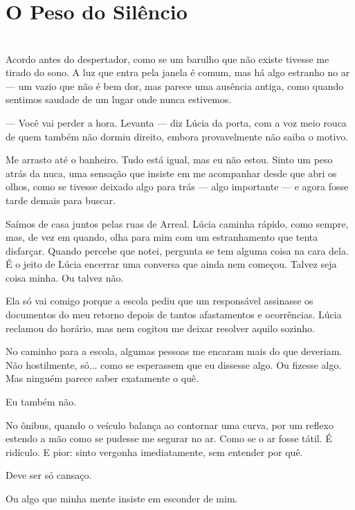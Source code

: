 \newpage
\ifdefined\useChapters
\chapter{O Peso do Silêncio}
\else
\chapter{}
\fi

Acordo antes do despertador, como se um barulho que não existe tivesse me tirado do sono. A luz que entra pela janela é comum, mas há algo estranho no ar — um vazio que não é bem dor, mas parece uma ausência antiga, como quando sentimos saudade de um lugar onde nunca estivemos.

— Você vai perder a hora. Levanta — diz Lúcia da porta, com a voz meio rouca de quem também não dormiu direito, embora provavelmente não saiba o motivo.

Me arrasto até o banheiro. Tudo está igual, mas eu não estou. Sinto um peso atrás da nuca, uma sensação que insiste em me acompanhar desde que abri os olhos, como se tivesse deixado algo para trás — algo importante — e agora fosse tarde demais para buscar.

Saímos de casa juntos pelas ruas de Arreal. Lúcia caminha rápido, como sempre, mas, de vez em quando, olha para mim com um estranhamento que tenta disfarçar. Quando percebe que notei, pergunta se tem alguma coisa na cara dela. É o jeito de Lúcia encerrar uma conversa que ainda nem começou. Talvez seja coisa minha. Ou talvez não.

Ela só vai comigo porque a escola pediu que um responsável assinasse os documentos do meu retorno depois de tantos afastamentos e ocorrências. Lúcia reclamou do horário, mas nem cogitou me deixar resolver aquilo sozinho.

No caminho para a escola, algumas pessoas me encaram mais do que deveriam. Não hostilmente, só... como se esperassem que eu dissesse algo. Ou fizesse algo. Mas ninguém parece saber exatamente o quê.

Eu também não.

\bigskip

No ônibus, quando o veículo balança ao contornar uma curva, por um reflexo estendo a mão como se pudesse me segurar no ar. Como se o ar fosse tátil. É ridículo. E pior: sinto vergonha imediatamente, sem entender por quê.

Deve ser só cansaço.

Ou algo que minha mente insiste em esconder de mim.

